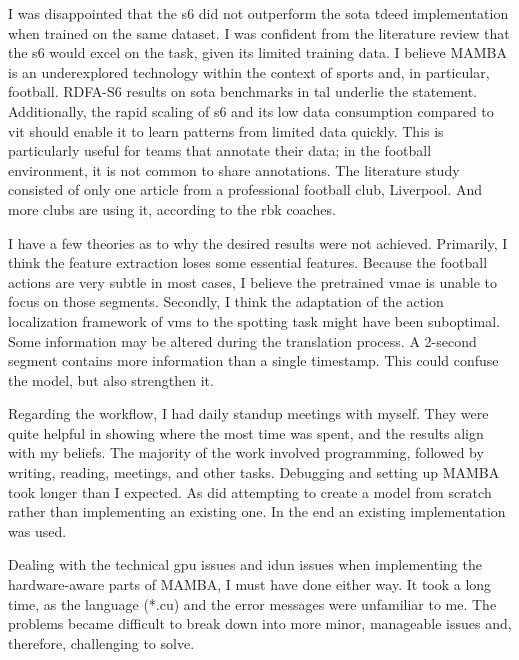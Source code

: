 I was disappointed that the \acrfull{s6} did not outperform the \acrshort{sota} \acrshort{tdeed} implementation when trained on the same dataset. I was confident from the literature review that the \acrshort{s6} would excel on the task, given its limited training data. I believe MAMBA is an underexplored technology within the context of sports\cite{survey_of_survey} and, in particular, football\cite{seweryn_survey_2023}. RDFA-S6\cite{lee_enhancing_mamba_s6_2024} results on \acrshort{sota} benchmarks in \acrshort{tal} underlie the statement. Additionally, the rapid scaling of \acrshort{s6} and its low data consumption compared to \acrfull{vit} should enable it to learn patterns from limited data quickly. This is particularly useful for teams that annotate their data; in the football environment, it is not common to share annotations. The literature study consisted of only one article from a professional football club, Liverpool. And more clubs are using it, according to the \acrshort{rbk} coaches. 

I have a few theories as to why the desired results were not achieved. Primarily, I think the feature extraction loses some essential features. Because the football actions are very subtle in most cases, I believe the pretrained \acrshort{vmae} is unable to focus on those segments. Secondly, I think the adaptation of the action localization framework of \acrshort{vms} to the spotting task might have been suboptimal. Some information may be altered during the translation process. A 2-second segment contains more information than a single timestamp. This could confuse the model, but also strengthen it. 

Regarding the workflow, I had daily standup meetings with myself. They were quite helpful in showing where the most time was spent, and the results align with my beliefs. The majority of the work involved programming, followed by writing, reading, meetings, and other tasks. Debugging and setting up MAMBA took longer than I expected. As did attempting to create a model from scratch rather than implementing an existing one. In the end an existing implementation was used.  

Dealing with the technical \acrshort{gpu} issues and \acrshort{idun} issues when implementing the hardware-aware parts of MAMBA, I must have done either way. It took a long time, as the language (*.cu) and the error messages were unfamiliar to me. The problems became difficult to break down into more minor, manageable issues and, therefore, challenging to solve. 

